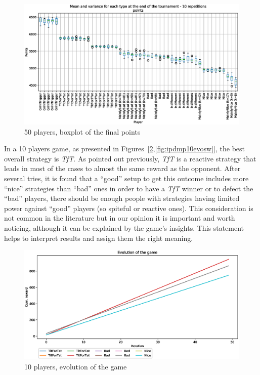 \documentclass[journal,10pt,twoside]{IEEEtran}
\begin{document}
\begin{figure}[!ht]
    \centering
    \includegraphics[width=1\columnwidth]{../img/ipdmp/ipdmp-boxplot-final-points-50}
    \caption{50 players, boxplot of the final points}
    \label{fig:ipdmp50boxfinal}
\end{figure}

In a 10 players game, as presented in Figures~[\ref{fig:ipdmp10evo},\ref{fig:ipdmp10evosw}], the best overall strategy is \textit{TfT}. As pointed out previously, \textit{TfT} is a reactive strategy that leads in most of the cases to almost the same reward as the opponent. After several tries, it is found that a ``good'' setup to get this outcome includes more ``nice'' strategies than ``bad'' ones in order to have a \textit{TfT} winner or to defect the ``bad'' players, there should be enough people with strategies having limited power against ``good'' players (so spiteful or reactive ones). This consideration is not common in the literature but in our opinion it is important and worth noticing, although it can be explained by the game's insights. This statement helps to interpret results and assign them the right meaning.

\begin{figure}[!ht]
    \centering
    \includegraphics[width=1\columnwidth]{../img/ipdmp/ipdmp-evolution-of-game-10}
    \caption{10 players, evolution of the game}
    \label{fig:ipdmp10evo}
\end{figure}
\end{document}
